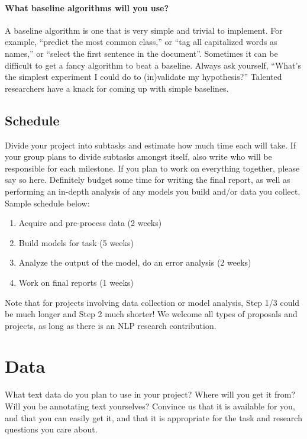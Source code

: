 \documentclass[11pt,a4paper]{article}
\begin{document}
\paragraph{What baseline algorithms will you use?}
A baseline algorithm is one that is very simple and trivial to implement. For example, ``predict the most common class,'' or ``tag all capitalized words as names,'' or ``select the first sentence in the document''. Sometimes it can be difficult to get a fancy algorithm to beat a baseline. Always ask yourself, ``What's the simplest experiment I could do to (in)validate my hypothesis?'' Talented researchers have a knack for coming up with simple baselines. 

\subsection{Schedule}
Divide your project into subtasks and estimate how much time each will take. If your group plans to divide subtasks amongst itself, also write who will be responsible for each milestone. If you plan to work on everything together, please say so here. Definitely budget some time for writing the final report, as well as performing an in-depth analysis of any models you build and/or data you collect. Sample schedule below:
\begin{enumerate}
    \item Acquire and pre-process data (2 weeks)
    \item Build models for task (5 weeks)
    \item Analyze the output of the model, do an error analysis (2 weeks)
    \item Work on final reports (1 weeks)
\end{enumerate}

Note that for projects involving data collection or model analysis, Step 1/3 could be much longer and Step 2 much shorter! We welcome all types of proposals and projects, as long as there is an NLP research contribution.

\section{Data}

What text data do you plan to use in your project? Where will you get it from? Will you be annotating text yourselves? Convince us that it is available for you, and that you can easily get it, and that it is appropriate for the task and research questions you care about.
\end{document}
